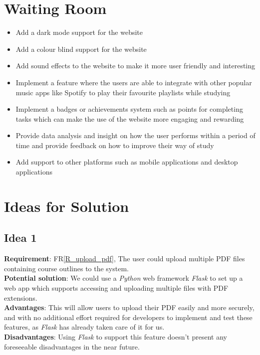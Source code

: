 \documentclass[12pt]{article}
\newcommand{\frref}[1]{FR\ref{#1}}
\begin{document}
\section{Waiting Room}
\begin{itemize}
  \item Add a dark mode support for the website
  \item Add a colour blind support for the website
  \item Add sound effects to the website to make it more user friendly and interesting
  \item Implement a feature where the users are able to integrate with other popular music apps like Spotify to play their favourite playlists while studying
  \item Implement a badges or achievements system such as points for completing tasks which can make the use of the website more engaging and rewarding 
  \item Provide data analysis and insight on how the user performs within a period of time and provide feedback on how to improve their way of study
  \item Add support to other platforms such as mobile applications and desktop applications
\end{itemize}

\section{Ideas for Solution}
\subsection{Idea 1}
\textbf{Requirement}: \frref{R_upload_pdf}, The user could upload multiple PDF files containing course outlines to the system. \\
\textbf{Potential solution}: We could use a \textit{Python} web framework \textit{Flask} to set up a web app which supports accessing and uploading multiple files with PDF extensions.\\
\textbf{Advantages}: This will allow users to upload their PDF easily and more securely, and with no additional effort required for developers to implement and test these features, as \textit{Flask} has already taken care of it for us.\\
\textbf{Disadvantages}: Using \textit{Flask} to support this feature doesn't present any foreseeable disadvantages in the near future. \\
\end{document}

